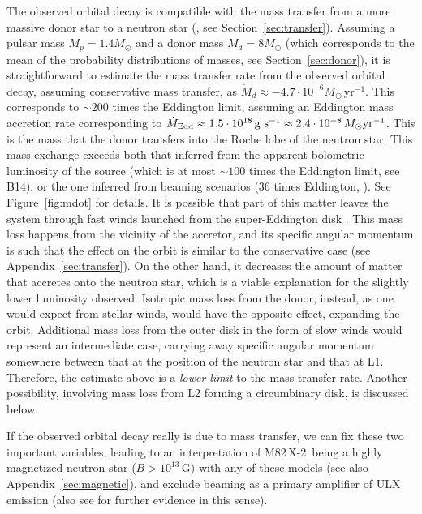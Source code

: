 \documentclass[twocolumn]{aastex631}
\newcommand{\Mtwo}{M82\,X-2\xspace}
\newcommand{\Mdot}{\ensuremath{\dot{M}}}
\newcommand{\msun}{\ensuremath{M_{\odot}}\xspace}
\newcommand{\msix}{\ensuremath{10^{-6}}\xspace}
\newcommand{\yrmone}{\ensuremath{\mathrm{yr^{-1}}}\xspace}
\newcommand{\msunyr}{\ensuremath{\msun\,\yrmone}\xspace}
\newcommand{\figref}{Figure~\ref}
\newcommand{\secref}{Section~\ref}
\begin{document}
The observed orbital decay is compatible with the mass transfer from a more massive donor star to a neutron star (\citealt{taurisFormationEvolutionCompact2006}, see \secref{sec:transfer}).
Assuming a pulsar mass $M_p=1.4\msun$ and a donor mass $M_d=8\msun$ (which corresponds to the mean of the probability distributions of masses, see \secref{sec:donor}), it is straightforward to estimate the mass transfer rate from the observed orbital decay, assuming conservative mass transfer, as $\Mdot_d \approx -4.7\cdot\msix\msunyr$.
This corresponds to $\sim200$ times the Eddington limit, assuming an Eddington mass accretion rate corresponding to $\Mdot_{\rm Edd}\approx1.5\cdot10^{18}\,{\rm g~s^{-1}}\approx2.4\cdot10^{-8}\,{\msun \rm yr^{-1}}$.
This is the mass that the donor transfers into the Roche lobe of the neutron star.
This mass exchange exceeds both that inferred from the apparent bolometric luminosity of the source (which is at most $\sim100$ times the Eddington limit, see B14), or the one inferred from beaming scenarios (36 times Eddington, \citealt{kingPulsingULXsTip2017}).
See \figref{fig:mdot} for details.
It is possible that part of this matter leaves the system through fast winds launched from the super-Eddington disk \citep{pintoUltrafastOutflowsUltraluminous2016,kosecEvidenceVariableUltrafast2018}.
This mass loss happens from the vicinity of the accretor, and its specific angular momentum is such that the effect on the orbit is similar to the conservative case (see Appendix~\ref{sec:transfer}).
On the other hand, it decreases the amount of matter that accretes onto the neutron star, which is a viable explanation for the slightly lower luminosity observed.
Isotropic mass loss from the donor, instead, as one would expect from stellar winds, would have the opposite effect, expanding the orbit.
Additional mass loss from the outer disk in the form of slow winds \citep[e.g.][]{middletonThermallyDrivenWinds2022} would represent an intermediate case, carrying away specific angular momentum somewhere between that at the position of the neutron star and that at L1.
Therefore, the estimate above is a \textit{lower limit} to the mass transfer rate.
Another possibility, involving mass loss from L2 forming a circumbinary disk, is discussed below.

If the observed orbital decay really is due to mass transfer, we can fix these two important variables, leading to an interpretation of \Mtwo\ being a highly magnetized neutron star ($B>10^{13}$\,G) with any of these models (see also Appendix~\ref{sec:magnetic}), and exclude beaming as a primary amplifier of ULX emission (also see \citealt{vasilopoulosChandraProbesXRay2021} for further evidence in this sense).
\end{document}
